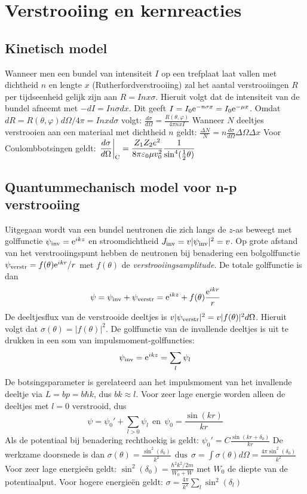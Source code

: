 \documentclass[twoside]{report}
\begin{document}
\section{Verstrooiing en kernreacties}
\subsection{Kinetisch model}
Wanneer men een bundel van intensiteit $I$ op een trefplaat laat vallen
met dichtheid $n$ en lengte $x$ (Rutherfordverstrooiing) zal het aantal
verstrooiingen $R$ per tijdseenheid gelijk zijn aan $R=Inx\sigma$. Hieruit
volgt dat de intensiteit van de bundel afneemt met $-dI=In\sigma dx$. Dit
geeft $I=I_0{\rm e}^{-n\sigma x}=I_0{\rm e}^{-\mu x}$.
\npar
Omdat $dR=R(\theta,\varphi)d\Omega/4\pi=Inxd\sigma$ volgt:
$\displaystyle\frac{d\sigma}{d\Omega}=\frac{R(\theta,\varphi)}{4\pi nxI}$
\npar
Wanneer $N$ deeltjes verstrooien aan een materiaal met dichtheid $n$
geldt:
$\displaystyle\frac{\Delta N}{N}=n\frac{d\sigma}{d\Omega}\Delta\Omega\Delta x$
\npar
Voor Coulombbotsingen geldt:
$\displaystyle\left.\frac{d\sigma}{d\Omega}\right|_{\rm C}=
\frac{Z_1Z_2e^2}{8\pi\varepsilon_0\mu v_0^2}\frac{1}{\sin^4(\mbox{$\frac{1}{2}$}\theta)}$

\subsection{Quantummechanisch model voor n-p verstrooiing}
Uitgegaan wordt van een bundel neutronen die zich langs de $z$-as beweegt met
golffunctie $\psi_{\rm inv}={\rm e}^{ikz}$ en stroomdichtheid
$J_{\rm inv}=v|\psi_{\rm inv}|^2=v$. Op grote afstand van het
verstrooiingspunt hebben de neutronen bij benadering een bolgolffunctie
$\psi_{\rm verstr}=f(\theta){\rm e}^{ikr}/r$ met $f(\theta)$ de
{\it verstrooiingsamplitude}. De totale golffunctie is dan
\[
\psi=\psi_{\rm inv}+\psi_{\rm verstr}={\rm e}^{ikz}+f(\theta)\frac{{\rm e}^{ikr}}{r}
\]
De deeltjesflux van de verstrooide deeltjes
is $v|\psi_{\rm verstr}|^2=v|f(\theta)|^2 d\Omega$. Hieruit volgt dat
$\sigma(\theta)=|f(\theta)|^2$. De golffunctie van de invallende deeltjes is
uit te drukken in een som van impulsmoment-golffuncties:
\[
\psi_{\rm inv}={\rm e}^{ikz}=\sum_l\psi_l
\]
De botsingsparameter is gerelateerd aan het
impulsmoment van het invallende deeltje via $L=bp=b\hbar k$, dus $bk\approx l$.
Voor zeer lage energie worden alleen de deeltjes met $l=0$ verstrooid, dus
\[
\psi=\psi_0'+\sum_{l>0}\psi_l~~\mbox{en}~~\psi_0=\frac{\sin(kr)}{kr}
\]
Als de potentiaal bij benadering rechthoekig is geldt:
$\displaystyle\psi_0'=C\frac{\sin(kr+\delta_0)}{kr}$
\npar
De werkzame doorsnede is dan
$\displaystyle
\sigma(\theta)=\frac{\sin^2(\delta_0)}{k^2}~~\mbox{dus}~~
\sigma=\int\sigma(\theta)d\Omega=\frac{4\pi\sin^2(\delta_0)}{k^2}$
\npar
Voor zeer lage energie\"en geldt:
$\displaystyle\sin^2(\delta_0)=\frac{\hbar^2k^2/2m}{W_0+W}$
\npar
met $W_0$ de diepte van de potentiaalput. Voor hogere energie\"en geldt:
$\displaystyle\sigma=\frac{4\pi}{k^2}\sum_l\sin^2(\delta_l)$
\end{document}
